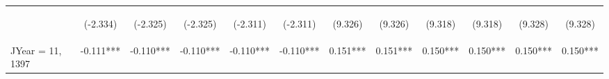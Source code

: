 \documentclass[]{article}
\begin{document}
\begin{center}
\begin{tabular}{lccccccccccc}
        \vspace{4pt}     & \begin{footnotesize}(-2.334)\end{footnotesize} & \begin{footnotesize}(-2.325)\end{footnotesize} & \begin{footnotesize}(-2.325)\end{footnotesize} & \begin{footnotesize}(-2.311)\end{footnotesize} & \begin{footnotesize}(-2.311)\end{footnotesize} & \begin{footnotesize}(9.326)\end{footnotesize}   & \begin{footnotesize}(9.326)\end{footnotesize}   & \begin{footnotesize}(9.318)\end{footnotesize}  & \begin{footnotesize}(9.318)\end{footnotesize}  & \begin{footnotesize}(9.328)\end{footnotesize}  & \begin{footnotesize}(9.328)\end{footnotesize}  \\
        JYear = 11, 1397 & -0.111***                                      & -0.110***                                      & -0.110***                                      & -0.110***                                      & -0.110***                                      & 0.151***                                        & 0.151***                                        & 0.150***                                       & 0.150***                                       & 0.150***                                       & 0.150***                                       \\

\end{tabular}
\end{center}
\end{document}
